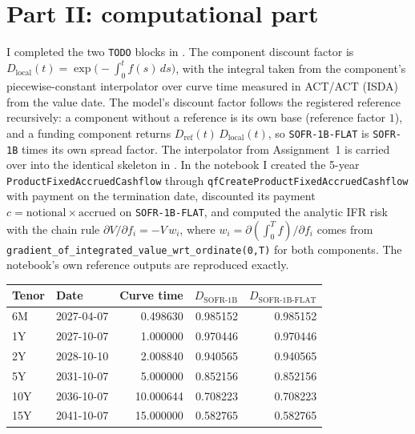 \documentclass[10pt]{article}
\newcommand{\code}[1]{\texttt{#1}}
\begin{document}
\section*{Part II: computational part}
I completed the two \code{TODO} blocks in . The component discount factor is
$D_{\mathrm{local}}(t)=\exp\bigl(-\int_0^t f(s)\,ds\bigr)$, with the integral taken from the component's piecewise-constant interpolator over
curve time measured in ACT/ACT (ISDA) from the value date. The model's discount factor follows the registered reference recursively:
a component without a reference is its own base (reference factor $1$), and a funding component returns
$D_{\mathrm{ref}}(t)\,D_{\mathrm{local}}(t)$, so \code{SOFR-1B-FLAT} is \code{SOFR-1B} times its own spread factor. The interpolator
from Assignment~1 is carried over into the identical skeleton in . In the notebook I created
the 5-year \code{ProductFixedAccruedCashflow} through \code{qfCreateProductFixedAccruedCashflow} with payment on the termination date,
discounted its payment $c=\text{notional}\times\text{accrued}$ on \code{SOFR-1B-FLAT}, and computed the analytic IFR risk with the chain rule
$\partial V/\partial f_i=-V\,w_i$, where $w_i=\partial(\int_0^T f)/\partial f_i$ comes from
\code{gradient\_of\_integrated\_value\_wrt\_ordinate(0,T)} for both components. The notebook's own reference outputs are reproduced exactly.

\begin{center}\small\setlength{\tabcolsep}{6pt}
\begin{tabular}{@{}llrrr@{}}\toprule
Tenor & Date & Curve time & $D_{\mathrm{SOFR\text{-}1B}}$ & $D_{\mathrm{SOFR\text{-}1B\text{-}FLAT}}$\\ \midrule
6M & 2027-04-07 & 0.498630 & 0.985152 & 0.985152 \\
1Y & 2027-10-07 & 1.000000 & 0.970446 & 0.970446 \\
2Y & 2028-10-10 & 2.008840 & 0.940565 & 0.940565 \\
5Y & 2031-10-07 & 5.000000 & 0.852156 & 0.852156 \\
10Y & 2036-10-07 & 10.000644 & 0.708223 & 0.708223 \\
15Y & 2041-10-07 & 15.000000 & 0.582765 & 0.582765 \\
\bottomrule\end{tabular}\end{center}
\end{document}

